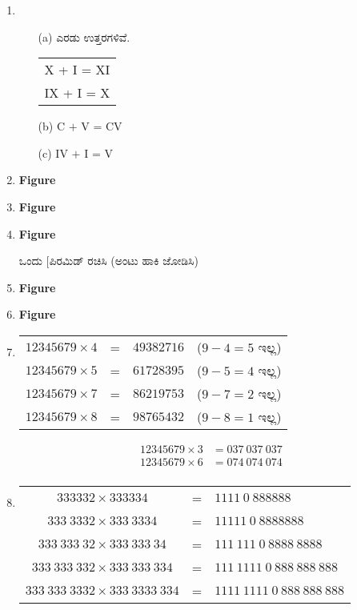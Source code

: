 \begin{enumerate}
\item 
\begin{itemize}
\item[(a)] ಎರಡು ಉತ್ತರಗಳಿವೆ. 
\begin{tabular}[t]{l}
X + I = XI\\
IX + I = X
\end{tabular}
\item[(b)] C $+$ V = CV
\item[(c)] IV $+$ I = V 
\end{itemize}

\item 
\begin{center}
{\bf Figure}
\end{center}

\item 
\begin{center}
{\bf Figure}
\end{center}

\item 
\begin{center}
{\bf Figure}
\end{center}

ಒಂದು [ಪಿರಮಿಡ್ ರಚಿಸಿ (ಅಂಟು ಹಾಕಿ ಜೋಡಿಸಿ)

\item 
\begin{center}
{\bf Figure}
\end{center}

\item 
\begin{center}
{\bf Figure}
\end{center}

\item 
\begin{tabular}[t]{llll}
$12345679\times 4$ & = & $49382716$ & ($9-4 = 5$ ಇಲ್ಲ)\\
$12345679\times 5$ & = & $61728395$ & ($9-5 = 4$ ಇಲ್ಲ)\\
$12345679\times 7$ & = & $86219753$ & ($9-7 = 2$ ಇಲ್ಲ)\\
$12345679\times 8$ & = & $98765432$ & ($9-8 = 1$ ಇಲ್ಲ)
\end{tabular}
\begin{align*}
12345679\times 3 & = 037~037~037\\
12345679\times 6 & = 074~074~074\\ 
\end{align*}

\item 
\begin{tabular}[t]{ccl}
$333332\times 333334$ & = & $1111~0~888888$\\
$333~3332\times 333~3334$ & = & $11111~0~8888888$\\
$333~333~32\times 333~333~34$ & = & $111~111~0~8888~8888$\\
$333~333~332\times 333~333~334$ & = & $111~1111~0~888~888~888$\\
$333~333~3332\times 333~3333~334$ & = & $1111~1111~0~888~888~888$\\
\end{tabular}


\end{enumerate}
